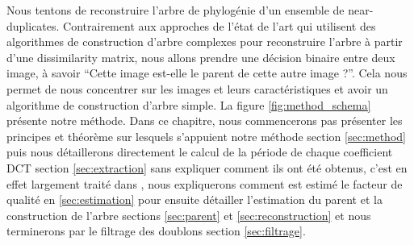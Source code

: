 \documentclass[utf8,final]{stageM2R} %
\begin{document}
Nous tentons de reconstruire l'arbre de phylogénie d'un ensemble de near-duplicates. Contrairement aux approches de l'état de l'art qui utilisent des algorithmes de construction d'arbre complexes pour reconstruire l'arbre à partir d'une dissimilarity matrix, nous allons prendre une décision binaire entre deux image, à savoir ``Cette image est-elle le parent de cette autre image ?''. Cela nous permet de nous concentrer sur les images et leurs caractéristiques et avoir un algorithme de construction d'arbre simple. La figure \ref{fig:method_schema} présente notre méthode. Dans ce chapitre, nous commencerons pas présenter les principes et théorème sur lesquels s'appuient notre méthode section \ref{sec:method} puis nous détaillerons directement le calcul de la période de chaque coefficient DCT section \ref{sec:extraction} sans expliquer comment ils ont été obtenus, c'est en effet largement traité dans \autocite{wallace1992jpeg}, nous expliquerons comment est estimé le facteur de qualité en \ref{sec:estimation} pour ensuite détailler l'estimation du parent et la construction de l'arbre sections \ref{sec:parent} et \ref{sec:reconstruction} et nous terminerons par le filtrage des doublons section \ref{sec:filtrage}.
\end{document}
